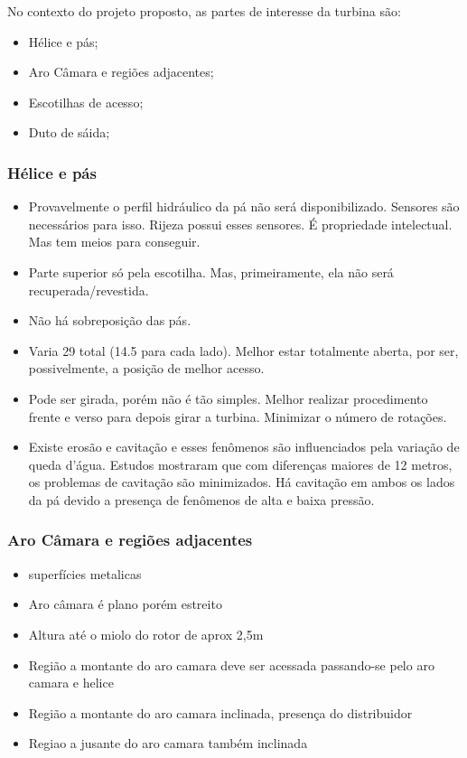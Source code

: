 No contexto do projeto proposto, as partes de interesse da turbina são:

\begin{itemize}
  \item Hélice e pás;
  \item Aro Câmara e regiões adjacentes;
  \item Escotilhas de acesso;
  \item Duto de sáida;
\end{itemize} 

\subsubsection{Hélice e pás}
\begin{itemize}
  \item Provavelmente o perfil hidráulico da pá não será disponibilizado. Sensores são necessários para isso. Rijeza possui esses sensores. 
  É propriedade intelectual. Mas tem meios para conseguir.
  \item Parte superior só pela escotilha. Mas, primeiramente, ela não será
  recuperada/revestida. 
  \item Não há sobreposição das pás.
  \item Varia 29 total (14.5 para cada lado). Melhor estar totalmente aberta, por ser, possivelmente, a posição 
de melhor acesso.
  \item  Pode ser girada, porém não é tão simples. Melhor realizar procedimento frente e verso para depois girar a 
turbina. Minimizar o número de rotações.
   \item Existe erosão e cavitação e esses fenômenos são influenciados pela
variação de queda d'água. Estudos mostraram que com diferenças maiores de 12 metros, os problemas de cavitação são 
minimizados.  Há cavitação em ambos os lados da pá devido a presença de fenômenos de alta e baixa pressão.
\end{itemize}

\subsubsection{Aro Câmara e regiões adjacentes}
\begin{itemize}
  \item superfícies metalicas
  \item Aro câmara é plano porém estreito
  \item Altura até o miolo do rotor de aprox 2,5m
  \item Região a montante do aro camara deve ser acessada passando-se pelo aro
  camara e helice
  \item Região a montante do aro camara inclinada, presença do distribuidor
  \item Regiao a jusante do aro camara também inclinada
\end{itemize}

